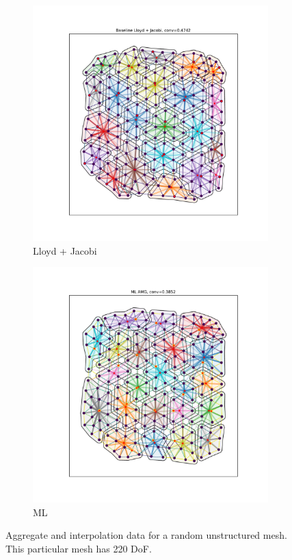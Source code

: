 \documentclass{article}
\begin{document}
\begin{figure}[h]
\begin{subfigure}[t]{0.32\textwidth}
    \includegraphics[width=\textwidth, trim=80 70 70 50, clip]{grid_700_lloyd.pdf}
    \caption{Lloyd + Jacobi}
  \end{subfigure}
  \begin{subfigure}[t]{0.32\textwidth}
    \centering
    \includegraphics[width=\textwidth, trim=80 70 70 50, clip]{grid_700_ml.pdf}
    \caption{ML}
  \end{subfigure}
  \caption{Aggregate and interpolation data for a random unstructured mesh.  This particular mesh has 220 DoF.}
  \label{fig:grid700}
\end{figure}
\end{document}
